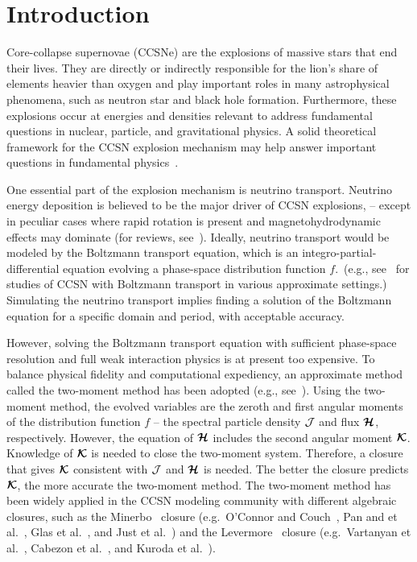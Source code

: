 \section{Introduction}

Core-collapse supernovae (CCSNe) are the explosions of massive stars that end their lives.
They are directly or indirectly responsible for the lion's share of elements heavier than oxygen and play important roles in many astrophysical phenomena, such as neutron star and black hole formation.
Furthermore, these explosions occur at energies and densities relevant to address fundamental questions in nuclear, particle, and gravitational physics. 
A solid theoretical framework for the CCSN explosion mechanism may help answer important questions in fundamental physics~\cite{janka_etal_2007}.

One essential part of the explosion mechanism is neutrino transport.
Neutrino energy deposition is believed to be the major driver of CCSN explosions, -- except in peculiar cases where rapid rotation is present and magnetohydrodynamic effects may dominate (for reviews, see~\cite{mezzacappa_2005,janka_2012,burrows_2013,muller_2016}).
Ideally, neutrino transport would be modeled by the Boltzmann transport equation, which is an integro-partial-differential equation evolving a phase-space distribution function $f$.~(e.g., see~\cite{mezzacappaBruenn_1993a,mezzacappaBruenn_1993b,mezzacappaBruenn_1993c,mezzacappa_etal_2001,liebendoerfer_etal_2001,liebendoerfer_etal_2004,livne_etal_2004,liebendoerfer_etal_2005,ott_etal_2008,sumiyoshiYamada_2012,nagakura_etal_2014,sumiyoshi_etal_2014,nagakura_etal_2018} for studies of CCSN with Boltzmann transport in various approximate settings.)
Simulating the neutrino transport implies finding a solution of the Boltzmann equation for a specific domain and period, with acceptable accuracy.

However, solving the Boltzmann transport equation with sufficient phase-space resolution and full weak interaction physics is at present too expensive.
To balance physical fidelity and computational expediency, an approximate method called the two-moment method has been adopted (e.g., see~\cite{kuroda_etal_2016,roberts_etal_2016,just_etal_2018,vartanyan_etal_2018}).
Using the two-moment method, the evolved variables are the zeroth and first angular moments of the distribution function $f$ -- the spectral particle density $\mathcal{J}$ and flux $\boldsymbol{\mathcal{H}}$, respectively.
However, the equation of $\boldsymbol{\mathcal{H}}$ includes the second angular moment $\boldsymbol{\mathcal{K}}$.
Knowledge of $\boldsymbol{\mathcal{K}}$ is needed to close the two-moment system.
Therefore, a closure that gives $\boldsymbol{\mathcal{K}}$ consistent with $\mathcal{J}$ and $\boldsymbol{\mathcal{H}}$ is needed.
The better the closure predicts $\boldsymbol{\mathcal{K}}$, the more accurate the two-moment method. 
The two-moment method has been widely applied in the CCSN modeling community with different algebraic closures, such as the Minerbo~\cite{minerbo_1978} closure (e.g.~{O'Connor} and {Couch}~\cite{oConnorCouch_2018}, Pan and et al.~\cite{pan_etal_2018}, Glas et al.~\cite{glas_etal_2018}, and Just et al.~\cite{just_etal_2018}) and the Levermore~\cite{levermore_1984} closure (e.g.~Vartanyan et al.~\cite{vartanyan_etal_2018}, Cabezon et al.~\cite{cabezon_etal_2018}, and Kuroda et al.~\cite{kuroda_etal_2016}). 

